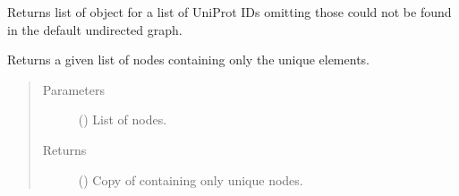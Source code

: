 \documentclass[letterpaper,10pt,english]{sphinxmanual}
\begin{document}
\begin{fulllineitems}
\begin{fulllineitems}
\begin{description}
\end{description}

\end{fulllineitems}


\begin{fulllineitems}
\label{\detokenize{main:pypath.main.PyPath.uniprots}}
Returns list of  object
for a list of UniProt IDs omitting those
could not be found in the default
undirected graph.

\end{fulllineitems}


\begin{fulllineitems}
\label{\detokenize{main:pypath.main.PyPath.uniq_node_list}}
Returns a given list of nodes containing only the unique
elements.
\begin{quote}\begin{description}
\item[{Parameters}] \leavevmode
{} () \textendash{} List of nodes.

\item[{Returns}] \leavevmode
() \textendash{} Copy of  containing only unique nodes.

\end{description}\end{quote}

\end{fulllineitems}


\begin{fulllineitems}
\label{\detokenize{main:pypath.main.PyPath.uniq_ptm}}
\end{fulllineitems}


\begin{fulllineitems}
\label{\detokenize{main:pypath.main.PyPath.uniq_ptms}}
\end{fulllineitems}


\end{fulllineitems}
\end{document}
